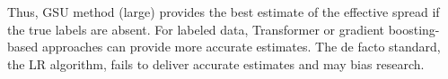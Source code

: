 Thus, \gls{GSU} method (large) provides the best estimate of the effective spread if the true labels are absent. For labeled data, Transformer or gradient boosting-based approaches can provide more accurate estimates. The de facto standard, the \gls{LR} algorithm, fails to deliver accurate estimates and may bias research.

